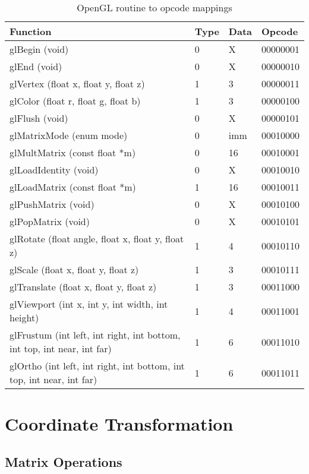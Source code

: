 \documentclass[letterpaper,10pt]{article}
\begin{document}
\begin{table}[h]
\begin{center}
\begin{tabular}{ | l | l | l | l |}
\hline
Function & Type & Data & Opcode \\ \hline
glBegin (void) & 0 & X & 00000001 \\ \hline
glEnd (void) & 0 & X & 00000010 \\ \hline
glVertex (float x, float y, float z) & 1 & 3 & 00000011 \\ \hline
glColor (float r, float g, float b) & 1 & 3 & 00000100 \\ \hline
glFlush (void) & 0 & X & 00000101 \\ \hline
glMatrixMode (enum mode) & 0 & imm & 00010000 \\ \hline
glMultMatrix (const float *m) & 0 & 16 & 00010001 \\ \hline
glLoadIdentity (void) & 0 & X & 00010010 \\ \hline
glLoadMatrix (const float *m) & 1 & 16 & 00010011 \\ \hline
glPushMatrix (void) & 0 & X & 00010100 \\ \hline
glPopMatrix (void) & 0 & X & 00010101 \\ \hline
glRotate (float angle, float x, float y, float z) & 1 & 4 & 00010110 \\ \hline
glScale (float x, float y, float z) & 1 & 3 & 00010111 \\ \hline
glTranslate (float x, float y, float z) & 1 & 3 & 00011000 \\ \hline
glViewport (int x, int y, int width, int height) & 1 & 4 & 00011001 \\ \hline
glFrustum (int left, int right, int bottom, int top, int near, int far) & 1 & 6 & 00011010 \\ \hline
glOrtho (int left, int right, int bottom, int top, int near, int far) & 1 & 6 & 00011011 \\ \hline
\end{tabular}
\end{center}
\caption{OpenGL routine to opcode mappings}
\end{table}

\section{Coordinate Transformation}
\subsection{Matrix Operations}
\end{document}
